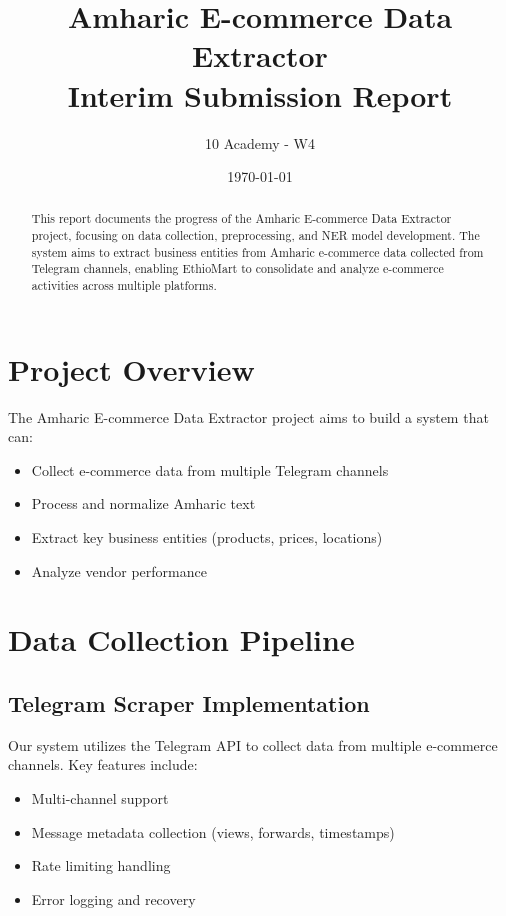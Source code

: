 \documentclass[12pt,a4paper]{article}
\title{Amharic E-commerce Data Extractor\\Interim Submission Report}
\author{10 Academy - W4}
\date{\today}
\begin{document}
\maketitle

\begin{abstract}
This report documents the progress of the Amharic E-commerce Data Extractor project, focusing on data collection, preprocessing, and NER model development. The system aims to extract business entities from Amharic e-commerce data collected from Telegram channels, enabling EthioMart to consolidate and analyze e-commerce activities across multiple platforms.
\end{abstract}

\tableofcontents
\newpage

\section{Project Overview}

The Amharic E-commerce Data Extractor project aims to build a system that can:
\begin{itemize}
    \item Collect e-commerce data from multiple Telegram channels
    \item Process and normalize Amharic text
    \item Extract key business entities (products, prices, locations)
    \item Analyze vendor performance
\end{itemize}

\section{Data Collection Pipeline}

\subsection{Telegram Scraper Implementation}
Our system utilizes the Telegram API to collect data from multiple e-commerce channels. Key features include:
\begin{itemize}
    \item Multi-channel support
    \item Message metadata collection (views, forwards, timestamps)
    \item Rate limiting handling
    \item Error logging and recovery
\end{itemize}
\end{document}
